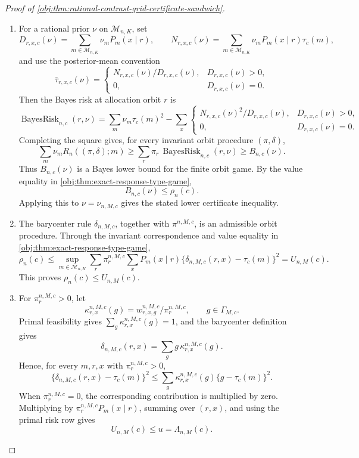 \documentclass[11pt]{article}
\begin{document}
\begin{proof}[Proof of \cref{obj:thm:rational-contrast-grid-certificate-sandwich}]
\begin{enumerate}
\item For a rational prior \(\nu\) on \(\mathcal M_{n,K}\), set
\[
D_{r,x,c}(\nu)
=
\sum_{m\in\mathcal M_{n,K}}\nu_m P_m(x\mid r),
\qquad
N_{r,x,c}(\nu)
=
\sum_{m\in\mathcal M_{n,K}}\nu_m P_m(x\mid r)\tau_c(m),
\]
and use the posterior-mean convention
\[
\bar\tau_{r,x,c}(\nu)=
\begin{cases}
N_{r,x,c}(\nu)/D_{r,x,c}(\nu),&D_{r,x,c}(\nu)>0,\\
0,&D_{r,x,c}(\nu)=0.
\end{cases}
\]
Then the Bayes risk at allocation orbit \(r\) is
\[
\operatorname{BayesRisk}_{n,c}(r,\nu)
=
\sum_m\nu_m\tau_c(m)^2
-
\sum_x
\begin{cases}
N_{r,x,c}(\nu)^2/D_{r,x,c}(\nu),&D_{r,x,c}(\nu)>0,\\
0,&D_{r,x,c}(\nu)=0.
\end{cases}
\]
Completing the square gives, for every invariant orbit procedure \((\pi,\delta)\),
\[
\sum_m\nu_m R_n((\pi,\delta);m)
\geq
\sum_r\pi_r\,\operatorname{BayesRisk}_{n,c}(r,\nu)
\geq
B_{n,c}(\nu).
\]
Thus \(B_{n,c}(\nu)\) is a Bayes lower bound for the finite orbit game.  By the value equality in \cref{obj:thm:exact-response-type-game},
\[
B_{n,c}(\nu)\leq \rho_n(c).
\]
Applying this to \(\nu=\nu_{n,M,c}\) gives the stated lower certificate inequality. %

\item The barycenter rule \(\delta_{n,M,c}\), together with \(\pi^{n,M,c}\), is an admissible orbit procedure.  Through the invariant correspondence and value equality in \cref{obj:thm:exact-response-type-game},
\[
\rho_n(c)
\leq
\sup_{m\in\mathcal M_{n,K}}
\sum_r \pi_r^{n,M,c}
\sum_x P_m(x\mid r)
\{\delta_{n,M,c}(r,x)-\tau_c(m)\}^2
=
U_{n,M}(c).
\]
This proves \(\rho_n(c)\leq U_{n,M}(c)\). %

\item For \(\pi_r^{n,M,c}>0\), let
\[
\kappa_{r,x}^{n,M,c}(g)
=
w_{r,x,g}^{n,M,c}/\pi_r^{n,M,c},
\qquad g\in\Gamma_{M,c}.
\]
Primal feasibility gives \(\sum_g\kappa_{r,x}^{n,M,c}(g)=1\), and the barycenter definition gives
\[
\delta_{n,M,c}(r,x)
=
\sum_g g\,\kappa_{r,x}^{n,M,c}(g).
\]
Hence, for every \(m,r,x\) with \(\pi_r^{n,M,c}>0\),
\[
\{\delta_{n,M,c}(r,x)-\tau_c(m)\}^2
\leq
\sum_g\kappa_{r,x}^{n,M,c}(g)\{g-\tau_c(m)\}^2.
\]
When \(\pi_r^{n,M,c}=0\), the corresponding contribution is multiplied by zero.  Multiplying by \(\pi_r^{n,M,c}P_m(x\mid r)\), summing over \((r,x)\), and using the primal risk row gives
\[
U_{n,M}(c)\leq u=\Lambda_{n,M}(c).
\]


\end{enumerate}
\end{proof}
\end{document}
